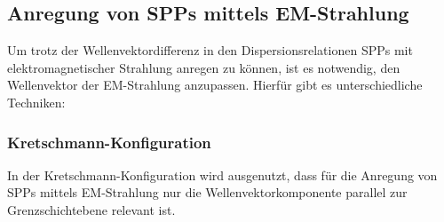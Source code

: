 \documentclass[a4paper, titlepage,  ngerman, fullpage]{book}
\begin{document}
	\subsection{Anregung von SPPs mittels EM-Strahlung}
	\label{sec:exictation}
	Um trotz der Wellenvektordifferenz in den Dispersionsrelationen SPPs mit elektromagnetischer Strahlung anregen zu können, ist es notwendig, den Wellenvektor der EM-Strahlung anzupassen. Hierfür gibt es unterschiedliche Techniken:
	\subsubsection{Kretschmann-Konfiguration}
	In der Kretschmann-Konfiguration wird ausgenutzt, dass für die Anregung von SPPs mittels EM-Strahlung nur die Wellenvektorkomponente parallel zur Grenzschichtebene relevant ist. 
		
\end{document}
